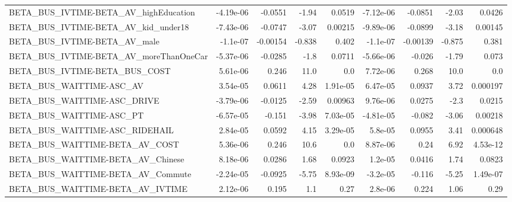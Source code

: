 \begin{tabular}{lrrrrrrrr}
BETA\_BUS\_IVTIME-BETA\_AV\_highEducation              &   -4.19e-06 &      -0.0551 &    -1.94 &   0.0519 &  -7.12e-06 &     -0.0851 &        -2.03 &        0.0426 \\
BETA\_BUS\_IVTIME-BETA\_AV\_kid\_under18                &   -7.43e-06 &      -0.0747 &    -3.07 &  0.00215 &  -9.89e-06 &     -0.0899 &        -3.18 &       0.00145 \\
BETA\_BUS\_IVTIME-BETA\_AV\_male                       &    -1.1e-07 &     -0.00154 &   -0.838 &    0.402 &   -1.1e-07 &    -0.00139 &       -0.875 &         0.381 \\
BETA\_BUS\_IVTIME-BETA\_AV\_moreThanOneCar             &   -5.37e-06 &      -0.0285 &     -1.8 &   0.0711 &  -5.66e-06 &      -0.026 &        -1.79 &         0.073 \\
BETA\_BUS\_IVTIME-BETA\_BUS\_COST                      &    5.61e-06 &        0.246 &     11.0 &      0.0 &   7.72e-06 &       0.268 &         10.0 &           0.0 \\
BETA\_BUS\_WAITTIME-ASC\_AV                           &    3.54e-05 &       0.0611 &     4.28 & 1.91e-05 &   6.47e-05 &      0.0937 &         3.72 &      0.000197 \\
BETA\_BUS\_WAITTIME-ASC\_DRIVE                        &   -3.79e-06 &      -0.0125 &    -2.59 &  0.00963 &   9.76e-06 &      0.0275 &         -2.3 &        0.0215 \\
BETA\_BUS\_WAITTIME-ASC\_PT                           &   -6.57e-05 &       -0.151 &    -3.98 & 7.03e-05 &  -4.81e-05 &      -0.082 &        -3.06 &       0.00218 \\
BETA\_BUS\_WAITTIME-ASC\_RIDEHAIL                     &    2.84e-05 &       0.0592 &     4.15 & 3.29e-05 &    5.8e-05 &      0.0955 &         3.41 &      0.000648 \\
BETA\_BUS\_WAITTIME-BETA\_AV\_COST                     &    5.36e-06 &        0.246 &     10.6 &      0.0 &   8.87e-06 &        0.24 &         6.92 &      4.53e-12 \\
BETA\_BUS\_WAITTIME-BETA\_AV\_Chinese                  &    8.18e-06 &       0.0286 &     1.68 &   0.0923 &    1.2e-05 &      0.0416 &         1.74 &        0.0823 \\
BETA\_BUS\_WAITTIME-BETA\_AV\_Commute                  &   -2.24e-05 &      -0.0925 &    -5.75 & 8.93e-09 &   -3.2e-05 &      -0.116 &        -5.25 &      1.49e-07 \\
BETA\_BUS\_WAITTIME-BETA\_AV\_IVTIME                   &    2.12e-06 &        0.195 &      1.1 &     0.27 &    2.8e-06 &       0.224 &         1.06 &          0.29 \\

\end{tabular}
